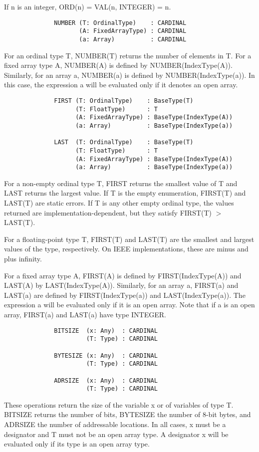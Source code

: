 \documentclass[10pt]{article}
\begin{document}
  If n is an integer, ORD(n) = VAL(n, INTEGER) = n. 


  
\begin{verbatim}
              NUMBER (T: OrdinalType)    : CARDINAL
                     (A: FixedArrayType) : CARDINAL
                     (a: Array)          : CARDINAL
\end{verbatim}
  For an ordinal type T, NUMBER(T) returns the number of elements in T. For a fixed array type A, NUMBER(A) is defined by NUMBER(IndexType(A)). Similarly, for an array a, NUMBER(a) is defined by NUMBER(IndexType(a)). In this case, the expression a will be evaluated only if it denotes an open array. 


  
\begin{verbatim}
              FIRST (T: OrdinalType)    : BaseType(T)
                    (T: FloatType)      : T
                    (A: FixedArrayType) : BaseType(IndexType(A))
                    (a: Array)          : BaseType(IndexType(a))

              LAST  (T: OrdinalType)    : BaseType(T)
                    (T: FloatType)      : T
                    (A: FixedArrayType) : BaseType(IndexType(A))
                    (a: Array)          : BaseType(IndexType(a))
\end{verbatim}
  For a non-empty ordinal type T, FIRST returns the smallest value of T and LAST returns the largest value. If T is the empty enumeration, FIRST(T) and LAST(T) are static errors. If T is any other empty ordinal type, the values returned are implementation-dependent, but they satisfy FIRST(T) $>$ LAST(T). 


  For a floating-point type T, FIRST(T) and LAST(T) are the smallest and largest values of the type, respectively. On IEEE implementations, these are minus and plus infinity. 


  For a fixed array type A, FIRST(A) is defined by FIRST(IndexType(A)) and LAST(A) by LAST(IndexType(A)). Similarly, for an array a, FIRST(a) and LAST(a) are defined by FIRST(IndexType(a)) and LAST(IndexType(a)). The expression a will be evaluated only if it is an open array. Note that if a is an open array, FIRST(a) and LAST(a) have type INTEGER. 


  
\begin{verbatim}
              BITSIZE  (x: Any)  : CARDINAL
                       (T: Type) : CARDINAL

              BYTESIZE (x: Any)  : CARDINAL
                       (T: Type) : CARDINAL

              ADRSIZE  (x: Any)  : CARDINAL
                       (T: Type) : CARDINAL
\end{verbatim}
  These operations return the size of the variable x or of variables of type T. BITSIZE returns the number of bits, BYTESIZE the number of 8-bit bytes, and ADRSIZE the number of addressable locations. In all cases, x must be a designator and T must not be an open array type. A designator x will be evaluated only if its type is an open array type. 
\end{document}
